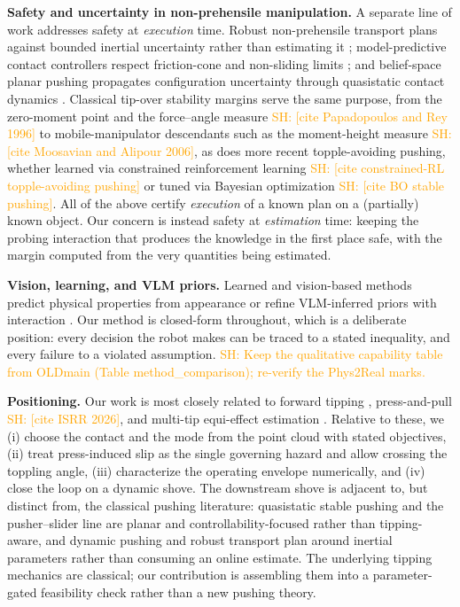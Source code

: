 \documentclass[10pt, conference]{IEEEtran}
\newcommand{\sh}[1]{\textcolor{orange}{SH: #1}}
\newcommand{\isrr}{\sh{[cite ISRR 2026]}}
\newcommand{\iros}{\cite{hyland_before_2026}}
\begin{document}
\noindent \textbf{Safety and uncertainty in non-prehensile manipulation.} A separate line of work addresses safety at \emph{execution} time. Robust non-prehensile transport plans against bounded inertial uncertainty rather than estimating it \cite{heins_robust_2025}; model-predictive contact controllers respect friction-cone and non-sliding limits \cite{selvaggio_non-prehensile_2023, heins_keep_2023}; and belief-space planar pushing propagates configuration uncertainty through quasistatic contact dynamics \cite{jankowski_robust_2025}. Classical tip-over stability margins serve the same purpose, from the zero-moment point and the force--angle measure \sh{[cite Papadopoulos and Rey 1996]} to mobile-manipulator descendants such as the moment-height measure \sh{[cite Moosavian and Alipour 2006]}, as does more recent topple-avoiding pushing, whether learned via constrained reinforcement learning \sh{[cite constrained-RL topple-avoiding pushing]} or tuned via Bayesian optimization \sh{[cite BO stable pushing]}. All of the above certify \emph{execution} of a known plan on a (partially) known object. Our concern is instead safety at \emph{estimation} time: keeping the probing interaction that produces the knowledge in the first place safe, with the margin computed from the very quantities being estimated.

\noindent \textbf{Vision, learning, and VLM priors.} Learned and vision-based methods predict physical properties from appearance \cite{xu_densephysnet_2019} or refine VLM-inferred priors with interaction \cite{wang_phys2real_2026}. Our method is closed-form throughout, which is a deliberate position: every decision the robot makes can be traced to a stated inequality, and every failure to a violated assumption. \sh{Keep the qualitative capability table from OLDmain (Table method\_comparison); re-verify the Phys2Real marks.}

\noindent \textbf{Positioning.} Our work is most closely related to forward tipping \iros{}, press-and-pull \isrr{}, and multi-tip equi-effect estimation \cite{yong_yu_estimation_1999}. Relative to these, we (i) choose the contact and the mode from the point cloud with stated objectives, (ii) treat press-induced slip as the single governing hazard and allow crossing the toppling angle, (iii) characterize the operating envelope numerically, and (iv) close the loop on a dynamic shove. The downstream shove is adjacent to, but distinct from, the classical pushing literature: quasistatic stable pushing \cite{mason_mechanics_1986, lynch_manipulation_1992} and the pusher--slider line \cite{zhou_pushing_nodate} are planar and controllability-focused rather than tipping-aware, and dynamic pushing \cite{lynch_dynamic_1996} and robust transport \cite{heins_robust_2025} plan around inertial parameters rather than consuming an online estimate. The underlying tipping mechanics are classical; our contribution is assembling them into a parameter-gated feasibility check rather than a new pushing theory.
\end{document}

